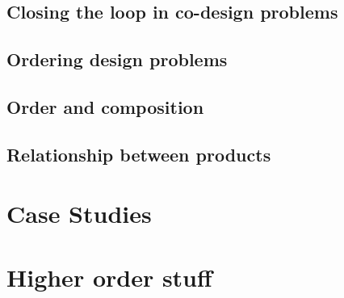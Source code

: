 {{\chapter{Closing the loop in co-design problems}

\clearpage
%
\chapter{Ordering design problems}

\clearpage
%
\chapter{Order and composition}

\clearpage
%
\chapter{Relationship between products}

\clearpage
%
%
}

\part{Case Studies}
\part{Higher order stuff}

}


%
%
%
%
\printbibliography